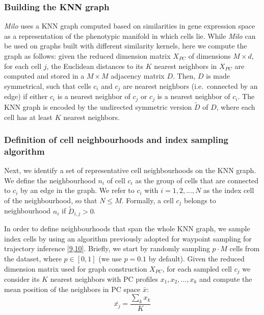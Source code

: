 \documentclass[
]{article}
\begin{document}
\hypertarget{building-the-knn-graph}{%
\subsubsection{Building the KNN graph}\label{building-the-knn-graph}}

\emph{Milo} uses a KNN graph computed based on similarities in gene expression space as a representation of the phenotypic manifold in which cells lie. While \emph{Milo} can be used on graphs built with different similarity kernels, here we compute the graph as follows: given the reduced dimension matrix \(X_{PC}\) of dimensions \(M \times d\), for each cell \(j\), the Euclidean distances to its \(K\) nearest neighbors in \(X_{PC}\) are computed and stored in a \(M \times M\) adjacency matrix \(D\). Then, \(D\) is made symmetrical, such that cells \(c_i\) and \(c_j\) are nearest neighbors (i.e.~connected by an edge) if either \(c_i\) is a nearest neighbor of \(c_j\) or \(c_j\) is a nearest neighbor of \(c_i\). The KNN graph is encoded by the undirected symmetric version \(\tilde{D}\) of \(D\), where each cell has at least \(K\) nearest neighbors.

\hypertarget{nh}{%
\subsubsection{Definition of cell neighbourhoods and index sampling algorithm}\label{nh}}

Next, we identify a set of representative cell neighbourhoods on the KNN graph. We define the neighbourhood \(n_i\) of cell \(c_i\) as the group of cells that are connected to \(c_i\) by an edge in the graph. We refer to \(c_i\) with \(i=1,2,...,N\) as the index cell of the neighbourhood, so that \(N \leq M\).
Formally, a cell \(c_j\) belongs to neighbourhood \(n_i\) if \(\tilde{D}_{i,j} > 0\).

In order to define neighbourhoods that span the whole KNN graph, we sample index cells by using an algorithm previously adopted for waypoint sampling for trajectory inference {[}\protect\hyperlink{ref-gutTrajectoriesCellcycleProgression2015}{9},\protect\hyperlink{ref-settyWishboneIdentifiesBifurcating2016}{10}{]}.
Briefly, we start by randomly sampling \(p \cdot M\) cells from the dataset, where \(p \in [0,1]\) (we use \(p = 0.1\) by default).
Given the reduced dimension matrix used for graph construction \(X_{PC}\), for each sampled cell \(c_j\) we consider its \(K\) nearest neighbors with PC profiles \({x_1, x_2, ... , x_k}\) and compute the mean position of the neighbors in PC space \(\bar{x}\):
\[
\bar{x_j} = \frac{ \sum_k x_k }{K}
\]
\end{document}
